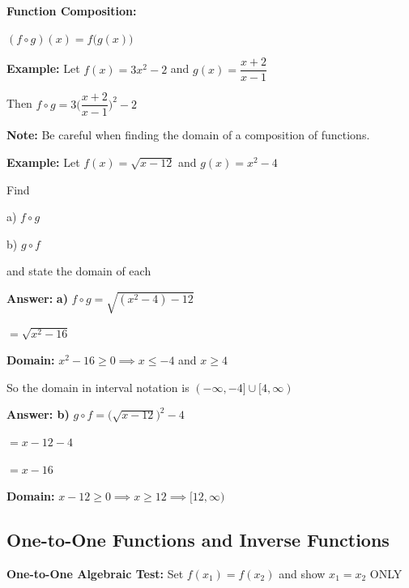 \documentclass[12pt]{article}
\newenvironment{myindentpar}[1]%
     {\begin{list}{}%
             {\setlength{\leftmargin}{#1}}%
             \item[]%
     }
     {\end{list}}
\begin{document}
\textbf{Function Composition:} 

$(f \circ g)(x) = f \Big(g(x)\Big)$
\begin{myindentpar}{1cm}


\textbf{Example:} Let $f(x) = 3x^2-2$ and $g(x) = \dfrac{x+2}{x-1}$ 

Then $f \circ g = 3 \Big(\dfrac{x+2}{x-1} \Big)^2 -2$

\textbf{Note:} Be careful when finding the domain of a composition of functions. 
\end{myindentpar}
\begin{myindentpar}{2cm}
\textbf{Example:} Let $f(x) = \sqrt{x-12}$ and $g(x) = x^2-4$

Find 

a) $f \circ g$ 

b) $g \circ f$ 

and state the domain of each
\end{myindentpar}
\begin{myindentpar}{2.5cm}
\textbf{Answer:}
 \textbf{a)} $f \circ g = \sqrt{(x^2-4)-12}$

\hspace{3.3cm} $ = \sqrt{x^2-16}$

\textbf{Domain:} $x^2 - 16 \geq 0 \implies x\leq -4$ and $x \geq 4$

So the domain in interval notation is $(-\infty, -4] \cup [4, \infty)$

\textbf{Answer: b)} $g \circ f = \Big(\sqrt{x-12}\Big)^2 -4$

\hspace{3.3cm} $ = x-12 -4$

\hspace{3.3cm} $ = x-16$

\textbf{Domain:} $x - 12 \geq 0 \implies x \geq  12 \implies [12 , \infty)$
\end{myindentpar}

\subsection{One-to-One Functions and Inverse Functions}


\textbf{One-to-One Algebraic Test:} Set $f(x_{1}) = f(x_{2})$ and show $x_{1} = x_{2}$ ONLY
\end{document}
